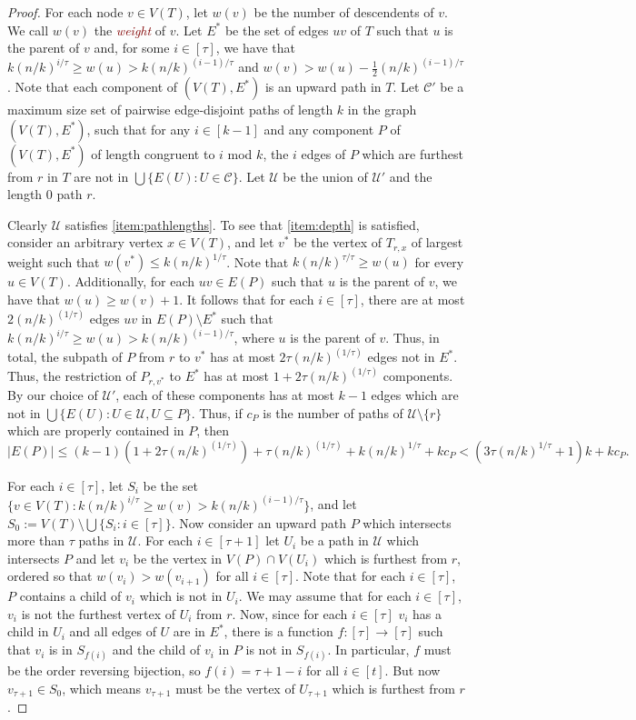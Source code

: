\documentclass[11pt]{article}
\newcommand{\defn}[1]{\textcolor{Maroon}{\emph{#1}}}
\renewcommand{\geq}{\geqslant}
\renewcommand{\leq}{\leqslant}
\theoremstyle{plain}
\theoremstyle{definition}
\begin{document}
		\begin{proof}
			For each node $v\in V(T)$, let $w(v)$ be the number of descendents of $v$. We call $w(v)$ the \defn{weight} of $v$.
			Let $E^*$ be the set of edges $uv$ of $T$ such that $u$ is the parent of $v$ and, for some $i\in [\tau]$, we have that $k(n/k)^{i/\tau}\geq w(u)> k(n/k)^{(i-1)/\tau}$ and $w(v)>w(u)-\frac{1}{2}(n/k)^{(i-1)/\tau}$.
			Note that each component of $(V(T),E^*)$ is an upward path in $T$.
 			Let $\mathcal{C}'$ be a maximum size set of pairwise edge-disjoint paths of length $k$ in the graph $(V(T),E^*)$, such that for any $i\in [k-1]$ and any component $P$ of $(V(T),E^*)$ of length congruent to $i$ mod $k$, the $i$ edges of $P$ which are furthest from $r$ in $T$ are not in $\bigcup \{E(U):U\in \mathcal{C}\}$.
            Let $\mathcal{U}$ be the union of $\mathcal{U}'$ and the length $0$ path $r$.
			
			Clearly $\mathcal{U}$ satisfies \ref{item:pathlengths}. To see that \ref{item:depth} is satisfied, consider an arbitrary vertex $x\in V(T)$, and let $v^*$ be the vertex of $T_{r,x}$ of largest weight such that $w(v^*)\leq k(n/k)^{1/\tau}$.
			Note that $k(n/k)^{\tau/\tau}\geq w(u)$ for every $u\in V(T)$.
			Additionally, for each $uv\in E(P)$ such that $u$ is the parent of $v$, we have that $w(u)\geq w(v)+1$.
			It follows that for each $i\in [\tau]$, there are at most $2(n/k)^{(1/\tau)}$ edges $uv$ in $E(P)\setminus E^*$ such that $k(n/k)^{i/\tau}\geq w(u)> k(n/k)^{(i-1)/\tau}$, where $u$ is the parent of $v$.
			Thus, in total, the subpath of $P$ from $r$ to $v^*$ has at most $2\tau(n/k)^{(1/\tau)}$ edges not in $E^*$. Thus, the restriction of $P_{r,v^*}$ to $E^*$ has at most $1+2\tau(n/k)^{(1/\tau)}$ components. By our choice of $\mathcal{U}'$, each of these components has at most $k-1$ edges which are not in 
			$\bigcup\{E(U):U\in\mathcal{U},U\subseteq P\}$. 
			Thus, if $c_P$ is the number of paths of $\mathcal{U}\setminus \{r\}$ which are properly contained in $P$, then 
			\[|E(P)| \leq (k-1)(1+2\tau(n/k)^{(1/\tau)})+\tau(n/k)^{(1/\tau)}+k(n/k)^{1/\tau}+kc_P<(3\tau(n/k)^{1/\tau}+1)k+kc_P.\]
			
			For each $i\in [\tau]$, let $S_i$ be the set $\{v\in V(T):k(n/k)^{i/\tau}\geq w(v)> k(n/k)^{(i-1)/\tau}\}$, and let $S_0:=V(T)\setminus \bigcup\{S_i:i\in [\tau]\}$.
			Now consider an upward path $P$ which intersects more than $\tau$ paths in $\mathcal{U}$.
			For each $i\in [\tau+1]$ let $U_i$ be a path in $\mathcal{U}$ which intersects $P$ and let $v_i$ be the vertex in $V(P)\cap V(U_i)$ which is furthest from $r$, ordered so that $w(v_i)>w(v_{i+1})$ for all $i\in [\tau]$.
			Note that for each $i\in [\tau]$, $P$ contains a child of $v_i$ which is not in $U_i$.
			We may assume that for each $i\in [\tau]$, $v_i$ is not the furthest vertex of $U_i$ from $r$.
			Now, since for each $i\in [\tau]$ $v_i$ has a child in $U_i$ and all edges of $U$ are in $E^*$, there is a function $f:[\tau]\to [\tau]$ such that $v_i$ is in $S_{f(i)}$ and the child of $v_i$ in $P$ is not in $S_{f(i)}$.
			In particular, $f$ must be the order reversing bijection, so $f(i)=\tau+1-i$ for all $i\in [t]$.
			But now $v_{\tau+1}\in S_0$, which means $v_{\tau+1}$ must be the vertex of $U_{\tau+1}$ which is furthest from $r$.
		\end{proof}
\end{document}
